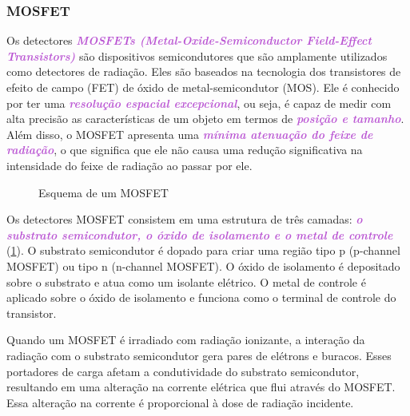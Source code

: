 \documentclass[11pt,a4paper]{article}
\begin{document}
\subsubsection*{MOSFET}

	Os detectores \textcolor{MediumOrchid}{\textit{\textbf{MOSFETs (Metal-Oxide-Semiconductor Field-Effect Transistors)}}} são dispositivos semicondutores que são amplamente utilizados como detectores de radiação. Eles são baseados na tecnologia dos transistores de efeito de campo (FET) de óxido de metal-semicondutor (MOS). Ele é conhecido por ter uma \textcolor{MediumOrchid}{\textit{\textbf{resolução espacial excepcional}}}, ou seja, é capaz de medir com alta precisão as características de um objeto em termos de \textcolor{MediumOrchid}{\textit{\textbf{posição e tamanho}}}. Além disso, o MOSFET apresenta uma \textcolor{MediumOrchid}{\textit{\textbf{mínima atenuação do feixe de radiação}}}, o que significa que ele não causa uma redução significativa na intensidade do feixe de radiação ao passar por ele.

	\begin{figure}
		\centering
		\caption{Esquema de um MOSFET}
		\label{fig:mosfet}
	\end{figure}

	Os detectores MOSFET consistem em uma estrutura de três camadas: \textcolor{MediumOrchid}{\textit{\textbf{o substrato semicondutor, o óxido de isolamento e o metal de controle}}} (\ref{fig:mosfet}). O substrato semicondutor é dopado para criar uma região tipo p (p-channel MOSFET) ou tipo n (n-channel MOSFET). O óxido de isolamento é depositado sobre o substrato e atua como um isolante elétrico. O metal de controle é aplicado sobre o óxido de isolamento e funciona como o terminal de controle do transistor.
	
	Quando um MOSFET é irradiado com radiação ionizante, a interação da radiação com o substrato semicondutor gera pares de elétrons e buracos. Esses portadores de carga afetam a condutividade do substrato semicondutor, resultando em uma alteração na corrente elétrica que flui através do MOSFET. Essa alteração na corrente é proporcional à dose de radiação incidente.
	
\end{document}
